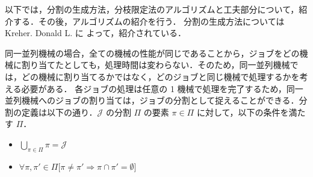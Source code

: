 \documentclass[12pt]{optlab-bachelor}
\begin{document}
以下では，分割の生成方法，分枝限定法のアルゴリズムと工夫部分について，紹介する．その後，アルゴリズムの紹介を行う．
分割の生成方法については Kreher. Donald L. \cite{rgf} に
よって，紹介されている．

同一並列機械の場合，全ての機械の性能が同じであることから，ジョブをどの機械に割り当てたとしても，処理時間は変わらない．そのため，同一並列機械では，どの機械に割り当てるかではなく，どのジョブと同じ機械で処理するかを考える必要がある．
各ジョブの処理は任意の 1 機械で処理を完了するため，同一並列機械へのジョブの割り当ては，ジョブの分割として捉えることができる．分割の定義は以下の通り．$\mathcal{J}$ の分割 $\Pi$ の要素 $\pi \in \Pi$ に対して，以下の条件を満たす $\Pi$．
\begin{itemize}
  \item $\displaystyle \bigcup_{\pi \in \Pi}\pi = \mathcal{J} $
  \item $\forall \pi, \pi' \in \Pi \big[\pi \neq \pi' \Rightarrow \pi \cap \pi' = \emptyset \big]$
\end{itemize}
\end{document}
